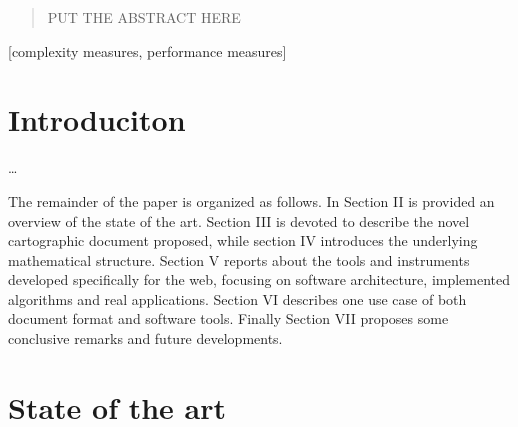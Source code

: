 \documentclass{sig-alternate}
\begin{document}
\date{30 July 1999}

\maketitle
\begin{abstract}
PUT THE ABSTRACT HERE
\end{abstract}

[complexity measures, performance measures]



\section{Introduciton}\label{introduciton}

\ldots{}

The remainder of the paper is organized as follows. In Section II is
provided an overview of the state of the art. Section III is devoted to
describe the novel cartographic document proposed, while section IV
introduces the underlying mathematical structure. Section V reports
about the tools and instruments developed specifically for the web,
focusing on software architecture, implemented algorithms and real
applications. Section VI describes one use case of both document format
and software tools. Finally Section VII proposes some conclusive remarks
and future developments.

\section{State of the art}\label{state-of-the-art}
\end{document}
